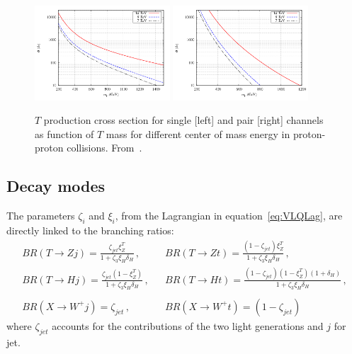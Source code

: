 \begin{figure}[!Hhtbp]
  \begin{center}
    \includegraphics[width=0.45\textwidth]{figs/pheno_prod_single_tp.png}
    \includegraphics[width=0.45\textwidth]{figs/pheno_prod_pair_tp.png}
    \caption{$T$ production cross section for single [left] and pair [right] channels as function of $T$ mass for different center of mass energy in proton-proton collisions. From~\cite{Cacciapaglia:2011fx}.}
    \label{fig:TProdXS}
  \end{center}
\end{figure}

\subsection{Decay modes}
\label{sec:decay}

The parameters $\zeta_{i}$ and $\xi_i$, from the Lagrangian in equation~\ref{eq:VLQLag}, are directly linked to the branching ratios:
 \begin{eqnarray} 
BR (T \to Z j) = \frac{\zeta_{jet} \xi^T_Z}{1+\zeta_3 \xi_H \delta_H}\,, & & BR (T \to Z t) = \frac{(1-\zeta_{jet}) \xi^T_Z}{1+\zeta_3 
\xi_H \delta_H}\,,\\
BR(T \to H j) = \frac{\zeta_{jet} (1-\xi^T_Z)}{1+\zeta_3 \xi_H \delta_H}\,, & &  BR(T \to H t) = \frac{(1-\zeta_{jet})
(1-\xi^T_Z) (1+\delta_H)}{1+\zeta_3 \xi_H \delta_H}\,, \nonumber\\
 & & \nonumber \\
BR(X \to W^+ j) = \zeta_{jet}\,, & & BR(X \to W^+ t) = (1-\zeta_{jet})
 \end{eqnarray} where $\zeta_{jet}$ accounts for the contributions of the two light generations and $j$ for jet.

